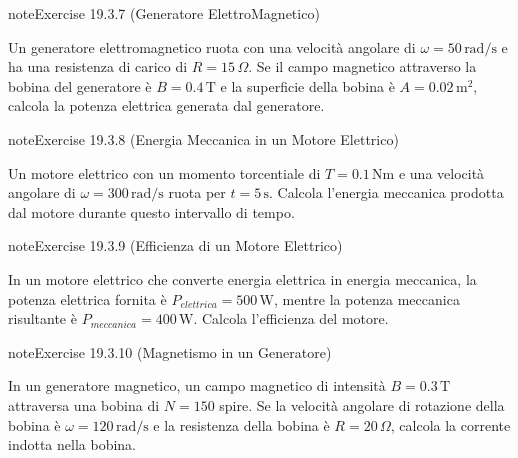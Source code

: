 \documentclass[letterpaper,10pt,italian]{jupyterBook}
\begin{document}
\begin{sphinxadmonition}{note}{Exercise 19.3.7 (Generatore Elettro\sphinxhyphen{}Magnetico)}



\sphinxAtStartPar
Un generatore elettromagnetico ruota con una velocità angolare di \(\omega = 50 \, \text{rad/s}\) e ha una resistenza di carico di \(R = 15 \, \Omega\). Se il campo magnetico attraverso la bobina del generatore è \(B = 0.4 \, \text{T}\) e la superficie della bobina è \(A = 0.02 \, \text{m}^2\), calcola la potenza elettrica generata dal generatore.
\end{sphinxadmonition}
 \label{exercise:ch/electromagnetism/electric-machines-problems-exercise-7}

\begin{sphinxadmonition}{note}{Exercise 19.3.8 (Energia Meccanica in un Motore Elettrico)}



\sphinxAtStartPar
Un motore elettrico con un momento torcentiale di \(T = 0.1 \, \text{Nm}\) e una velocità angolare di \(\omega = 300 \, \text{rad/s}\) ruota per \(t = 5 \, \text{s}\). Calcola l’energia meccanica prodotta dal motore durante questo intervallo di tempo.
\end{sphinxadmonition}
 \label{exercise:ch/electromagnetism/electric-machines-problems-exercise-8}

\begin{sphinxadmonition}{note}{Exercise 19.3.9 (Efficienza di un Motore Elettrico)}



\sphinxAtStartPar
In un motore elettrico che converte energia elettrica in energia meccanica, la potenza elettrica fornita è \(P_{elettrica} = 500 \, \text{W}\), mentre la potenza meccanica risultante è \(P_{meccanica} = 400 \, \text{W}\). Calcola l’efficienza del motore.
\end{sphinxadmonition}
 \label{exercise:ch/electromagnetism/electric-machines-problems-exercise-9}

\begin{sphinxadmonition}{note}{Exercise 19.3.10 (Magnetismo in un Generatore)}



\sphinxAtStartPar
In un generatore magnetico, un campo magnetico di intensità \(B = 0.3 \, \text{T}\) attraversa una bobina di \(N = 150\) spire. Se la velocità angolare di rotazione della bobina è \(\omega = 120 \, \text{rad/s}\) e la resistenza della bobina è \(R = 20 \, \Omega\), calcola la corrente indotta nella bobina.
\end{sphinxadmonition}
\end{document}
